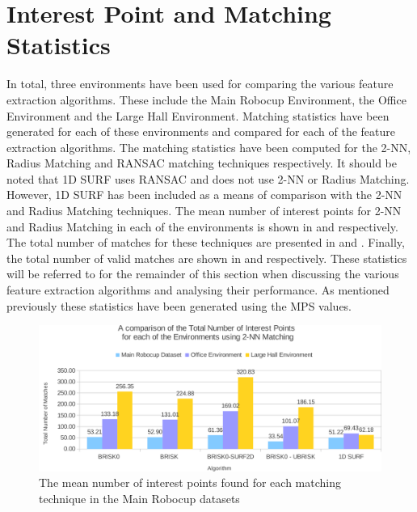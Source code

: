 \documentclass{report}
\begin{document}
\section{Interest Point and Matching Statistics}
\label{sec:matchingStats}
In total, three environments have been used for comparing the various feature extraction algorithms. These include the Main Robocup Environment, the Office Environment and the Large Hall Environment. Matching statistics have been generated for each of these environments and compared for each of the feature extraction algorithms. The matching statistics have been computed for the 2-NN, Radius Matching and RANSAC matching techniques respectively. It should be noted that 1D SURF uses RANSAC and does not use 2-NN or Radius Matching. However, 1D SURF has been included as a means of comparison with the 2-NN and Radius Matching techniques. The mean number of interest points for 2-NN and Radius Matching in each of the environments is shown in  and  respectively. The total number of matches for these techniques are presented in  and . Finally, the total number of valid matches are shown in  and  respectively. These statistics will be referred to for the remainder of this section when discussing the various feature extraction algorithms and analysing their performance. As mentioned previously these statistics have been generated using the MPS values.\\

 \begin{figure}%
  \centering
    \includegraphics[width=1.0\textwidth]{../Drawings/Graphs/overall_tn_ip.pdf}
    \caption{The mean number of interest points found for each matching technique in the Main Robocup datasets} 
    \label{fig:overall_tn_ip}
 \end{figure}
 
\end{document}
